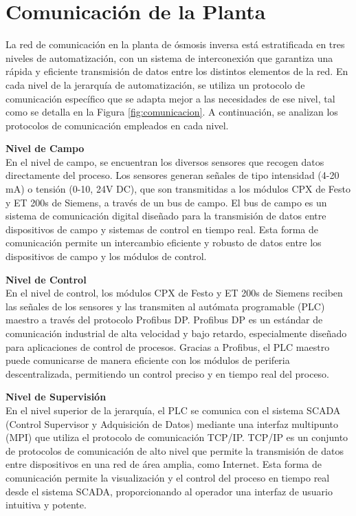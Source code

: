 \section{Comunicación de la Planta}

La red de comunicación en la planta de ósmosis inversa está estratificada en tres niveles de automatización, con un sistema de interconexión que garantiza una rápida y eficiente transmisión de datos entre los distintos elementos de la red. En cada nivel de la jerarquía de automatización, se utiliza un protocolo de comunicación específico que se adapta mejor a las necesidades de ese nivel, tal como se detalla en la Figura \ref{fig:comunicacion}. A continuación, se analizan los protocolos de comunicación empleados en cada nivel.

\textbf{Nivel de Campo}\\
En el nivel de campo, se encuentran los diversos sensores que recogen datos directamente del proceso. Los sensores generan señales de tipo intensidad (4-20 mA) o tensión (0-10, 24V DC), que son transmitidas a los módulos CPX de Festo y ET 200s de Siemens, a través de un bus de campo. El bus de campo es un sistema de comunicación digital diseñado para la transmisión de datos entre dispositivos de campo y sistemas de control en tiempo real. Esta forma de comunicación permite un intercambio eficiente y robusto de datos entre los dispositivos de campo y los módulos de control.

\textbf{Nivel de Control}\\
En el nivel de control, los módulos CPX de Festo y ET 200s de Siemens reciben las señales de los sensores y las transmiten al autómata programable (PLC) maestro a través del protocolo Profibus DP. Profibus DP es un estándar de comunicación industrial de alta velocidad y bajo retardo, especialmente diseñado para aplicaciones de control de procesos. Gracias a Profibus, el PLC maestro puede comunicarse de manera eficiente con los módulos de periferia descentralizada, permitiendo un control preciso y en tiempo real del proceso.

\textbf{Nivel de Supervisión}\\
En el nivel superior de la jerarquía, el PLC se comunica con el sistema SCADA (Control Supervisor y Adquisición de Datos) mediante una interfaz multipunto (MPI) que utiliza el protocolo de comunicación TCP/IP. TCP/IP es un conjunto de protocolos de comunicación de alto nivel que permite la transmisión de datos entre dispositivos en una red de área amplia, como Internet. Esta forma de comunicación permite la visualización y el control del proceso en tiempo real desde el sistema SCADA, proporcionando al operador una interfaz de usuario intuitiva y potente.


